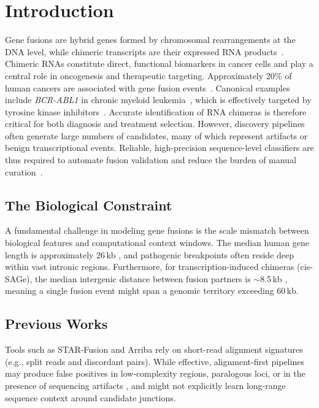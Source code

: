 \documentclass{bioinfo}
\begin{document}
\section{Introduction}
Gene fusions are hybrid genes formed by chromosomal re\-arrange\-ments at the DNA level, while chimeric transcripts are their expressed RNA products~\cite{chimeras_shape}. Chimeric RNAs constitute direct, functional biomarkers in cancer cells and play a central role in oncogenesis and therapeutic targeting. Approximately 20\% of human cancers are associated with gene fusion events~\cite{mitelman2007impact}. Canonical examples include \textit{BCR-ABL1} in chronic myeloid leukemia~\cite{bcr_abl}, which is effectively targeted by tyrosine kinase inhibitors~\cite{imatinib}. Accurate identification of RNA chimeras is therefore critical for both diagnosis and treatment selection. However, discovery pipelines often generate large numbers of candidates, many of which represent artifacts or benign transcriptional events. Reliable, high-precision sequence-level classifiers are thus required to automate fusion validation and reduce the burden of manual curation~\cite{chitars_db}.
\subsection{The Biological Constraint}
A fundamental challenge in modeling gene fusions is the scale mismatch between biological features and computational context windows. The median human gene length is approximately 26\,kb \cite{gene_length_stats}, and pathogenic breakpoints often reside deep within vast intronic regions. Furthermore, for transcription-induced chimeras (cis-SAGe), the median intergenic distance between fusion partners is $\sim$8.5\,kb \cite{giacomini2013}, meaning a single fusion event might span a genomic territory exceeding 60\,kb. 

\subsection{Previous Works}
Tools such as STAR-Fusion \cite{starfusion} and Arriba \cite{arriba} rely on short-read alignment signatures (e.g., split reads and discordant pairs). While effective, alignment-first pipelines may produce false positives in low-complexity regions, paralogous loci, or in the presence of sequencing artifacts \cite{fusion_challenges}, and might not explicitly learn long-range sequence context around candidate junctions.
\end{document}
